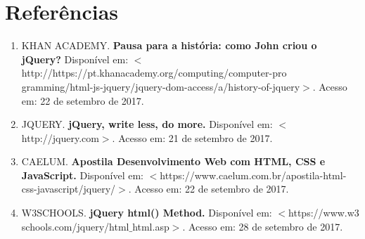 \documentclass[12pt,a4paper]{article}
\begin{document}
\section{Referências}
\begin{enumerate}

\item KHAN ACADEMY. \textbf{Pausa para a história: como John criou o jQuery?} Disponível em: $<$http://https://pt.khanacademy.org/computing/computer-pro
gramming/html-js-jquery/jquery-dom-access/a/history-of-jquery$>$. Acesso em: 22 de setembro de 2017.

\item JQUERY. \textbf{jQuery, write less, do more.} Disponível em: $<$http://jquery.com$>$. Acesso em: 21 de setembro de 2017.

\item CAELUM. \textbf{Apostila Desenvolvimento Web com HTML, CSS e JavaScript.} Disponível em: $<$https://www.caelum.com.br/apostila-html-css-javascript/jquery/$>$. Acesso em: 22 de setembro de 2017.

\item W3SCHOOLS. \textbf{jQuery html() Method.} Disponível em: $<$https://www.w3
schools.com/jquery/html$\_$html.asp$>$. Acesso em: 28 de setembro de 2017.

\end{enumerate}
\end{document}

